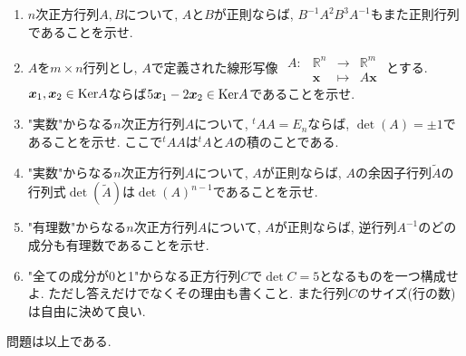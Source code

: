 \documentclass[dvipdfmx,a4paper,11pt]{article}
\newcommand{\R}{\mathbb{R}}
\theoremstyle{definition}
\begin{document}
\begin{enumerate}[label={\Large \textbf{第}\arabic*\textbf{問}.}]
 \begin{enumerate}[label=(\arabic*).]
\setlength{\parskip}{0cm} %
  \setlength{\itemsep}{0cm}
 \item $n$次正方行列$A, B$について, $A$と$B$が正則ならば, $B^{-1}A^2 B^3A^{-1}$もまた正則行列であることを示せ. 
 \item $A$を$m \times n$行列とし, $A$で定義された線形写像
$\begin{array}{cccc}
A:&  \R^n&\rightarrow& \R^m \\
& \bm{x}&\longmapsto & A\bm{x}
\end{array}
$
とする. \\
$\bm{x}_1, \bm{x}_2 \in {\rm  Ker}A$ならば$5\bm{x}_1-2\bm{x}_2 \in {\rm  Ker}A$であることを示せ. 
 \item "実数"からなる$n$次正方行列$A$について, $^{t}A A=E_n$ならば, $\det (A) = \pm 1$であることを示せ.  ここで$^{t}A A$は$^{t}A $と$A$の積のことである.
\item  "実数"からなる$n$次正方行列$A$について, $A$が正則ならば, $A$の余因子行列$\tilde{A}$の行列式$\det(\tilde{A})$は$\det(A)^{n-1}$であることを示せ. 
\item "有理数"からなる$n$次正方行列$A$について, $A$が正則ならば, 逆行列$A^{-1}$のどの成分も有理数であることを示せ. 
\item "全ての成分が0と1"からなる正方行列$C$で$\det C=5$となるものを一つ構成せよ. ただし答えだけでなくその理由も書くこと. また行列$C$のサイズ(行の数)は自由に決めて良い. 
 \end{enumerate} 

  \end{enumerate}
  

  \begin{flushright}
\LARGE{問題は以上である. }
\end{flushright}

 
\end{document}

